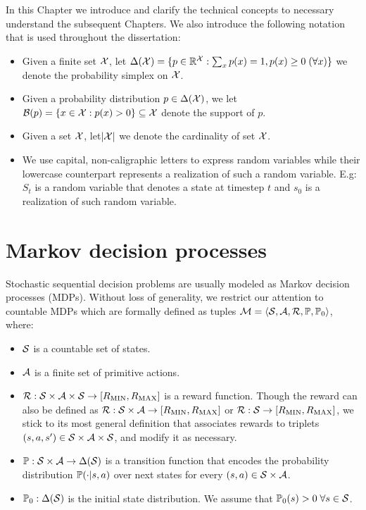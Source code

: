 In this Chapter we introduce and clarify the technical concepts to necessary understand the subsequent Chapters. We also introduce the following notation that is used throughout the dissertation:
\begin{itemize}
  \item Given a finite set $\mathcal{X}$, let $\Delta(\mathcal{X})=\{p\in\mathbb{R}^{\mathcal{X}}:\sum_x p(x)=1, p(x)\geq 0\;(\forall x)\}$ we denote the probability simplex on $\mathcal{X}$. 
  \item Given a probability distribution $p\in\Delta(\mathcal{X})$, we let $\mathcal{B}(p)=\{x\in\mathcal{X}:p(x) > 0\}\subseteq\mathcal{X}$ denote the support of $p$.
  \item Given a set $\mathcal{X}$, let$\lvert\mathcal{X}\rvert$ we denote the cardinality of set $\mathcal{X}$.
  \item We use capital, non-caligraphic letters to express random variables while their lowercase counterpart represents a realization of such a random variable. E.g: $S_t$ is a random variable that denotes a state at timestep $t$ and $s_0$ is a realization of such random variable.
\end{itemize}
\section{Markov decision processes}
Stochastic sequential decision problems are usually modeled as Markov decision processes (MDPs). Without loss of generality, we restrict our attention to countable MDPs which are formally defined as tuples $\mathcal{M}=\langle\mathcal{S},\mathcal{A},\mathcal{R},\mathbb{P},\mathbb{P}_0\rangle$, where:
\begin{itemize}
  \item $\mathcal{S}$ is a countable set of states.
  \item $\mathcal{A}$ is a finite set of primitive actions.
  \item $\mathcal{R}:\mathcal{S}\times\mathcal{A}\times\mathcal{S}\rightarrow[R_\text{MIN}, R_\text{MAX}]$ is a reward function. Though the reward can also be defined as $\mathcal{R}:\mathcal{S}\times\mathcal{A}\rightarrow[R_\text{MIN}, R_\text{MAX}]$ or $\mathcal{R}:\mathcal{S}\rightarrow[R_\text{MIN}, R_\text{MAX}]$, we stick to its most general definition that associates rewards to triplets $(s, a, s')\in\mathcal{S}\times\mathcal{A}\times\mathcal{S}$, and modify it as necessary.
  \item $\mathbb{P}:\mathcal{S}\times\mathcal{A}\rightarrow\Delta(\mathcal{S})$ is a transition function that encodes the probability distribution $\mathbb{P}(\cdot\lvert s, a)$ over next states for every $(s, a)\in\mathcal{S}\times\mathcal{A}$.
  \item $\mathbb{P}_0:\Delta(\mathcal{S})$ is the initial state distribution. We assume that $\mathbb{P}_0(s)>0\;\forall s\in\mathcal{S}$.
\end{itemize}

